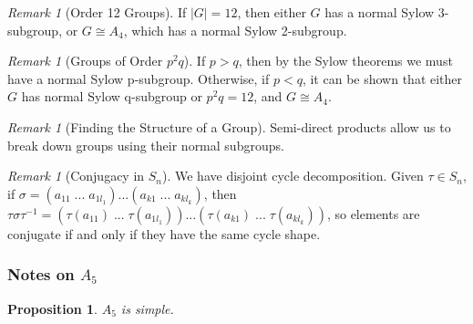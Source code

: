\documentclass[12pt]{article}
\newtheorem{prop}[thm]{Proposition}
\theoremstyle{definition}
\theoremstyle{remark}
\newtheorem{rmk}[thm]{Remark}
\numberwithin{equation}{section}
\begin{document}
\vspace{15pt}


\begin{rmk}[Order 12 Groups]
        If $|G| = 12$, then either $G$ has a normal Sylow 3-subgroup, or $G \cong A_4$, which has a normal Sylow 2-subgroup.
\end{rmk}


\vspace{15pt}

\begin{rmk}[Groups of Order $p^2q$]
        If $p > q$, then by the Sylow theorems we must have a normal Sylow p-subgroup. Otherwise, if $p < q$, it can be shown that either $G$ has normal Sylow q-subgroup or $p^2q = 12$, and $G \cong A_4$.
\end{rmk}


\vspace{15pt}


\begin{rmk}[Finding the Structure of a Group]
        Semi-direct products allow us to break down groups using their normal subgroups.
\end{rmk}


\vspace{15pt}

\begin{rmk}[Conjugacy in $S_n$]
        We have disjoint cycle decomposition. Given $\tau \in S_n$, if $\sigma = (a_{11}\;...\;a_{1l_1})...(a_{k1}\;...\;a_{kl_k})$, then $\tau\sigma\tau^{-1} = (\tau(a_{11})\;...\;\tau(a_{1l_1}))...(\tau(a_{k1})\;...\;\tau(a_{kl_k}))$, so elements are conjugate if and only if they have the same cycle shape.
\end{rmk}


\vspace{15pt}

\subsubsection{Notes on $A_5$}

\begin{prop}
        $A_5$ is simple.
\end{prop}

\vspace{15pt}
\end{document}
